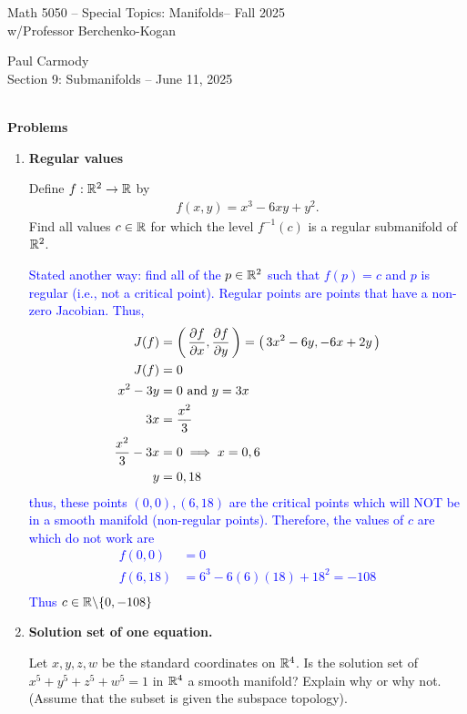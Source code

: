 \documentclass[12pt,a4paper]{report}
\newcommand{\CLASSNAME}{Math 5050 -- Special Topics: Manifolds}
\newcommand{\STUDENTNAME}{Paul Carmody}
\newcommand{\ASSIGNMENT}{Section 9: Submanifolds }
\newcommand{\DUEDATE}{June 11, 2025}
\newcommand{\PROFESSOR}{Professor Berchenko-Kogan}
\newcommand{\SEMESTER}{Fall 2025}
\newcommand{\BLUE}[1]{\textcolor{blue}{#1}}
\begin{document}
\begin{center}
	\Large{\CLASSNAME -- \SEMESTER} \\
	\large{ w/\PROFESSOR}
\end{center}
\begin{center}
	\STUDENTNAME \\
	\ASSIGNMENT -- \DUEDATE\\
\end{center} 


\noindent \textbf{\\\large{Problems}}

\begin{enumerate}[label=9.\arabic*.]

\item \textbf{Regular values}

Define $f:\mathbb{R}^2\to \mathbb{R}$ by
\begin{align*}
	f(x,y) = x^3-6xy+y^2.
\end{align*}Find all values $c \in \mathbb{R}$ for which the level $f^{-1}(c)$ is a regular submanifold of $\mathbb{R}^2$.

\BLUE{Stated another way: find all of the $p \in \mathbb{R}^2$ such that $f(p)=c$ and $p$ is regular (i.e., not a critical point).  Regular points are points that have a non-zero Jacobian.  Thus,
\begin{align*}
	J(f) &= \left (\, \frac{\partial f}{\partial x},\frac{\partial f}{\partial y} \,\right ) = \left (\, 3x^2-6y, -6x+2y \,\right ) \\
	J(f) &= 0 \\
	x^2-3y &= 0 \text{ and } y= 3x \\
	3x &= \frac{x^2}{3} \\
	\frac{x^2}{3} -3x &= 0 \implies x=0,6 \\
	y &= 0, 18
\end{align*}thus, these points $(0,0), (6,18)$ are the critical points which will NOT be in a smooth manifold (non-regular points).  Therefore, the values of $c$ are which do not work are
\begin{align*}
	f(0,0) &= 0 \\
	f(6,18) &= 6^3-6(6)(18)+18^2 = -108 \\
\end{align*}Thus $c \in \mathbb{R} \backslash \{0, -108\}$
}

\item \textbf{Solution set of one equation.}

Let $x,y,z,w$ be the standard coordinates on $\mathbb{R}^4$.  Is the solution set of $x^5+y^5+z^5+w^5=1$ in $\mathbb{R}^4$ a smooth manifold?  Explain why or why not.  (Assume that the subset is given the subspace topology).


\end{enumerate}
\end{document}
